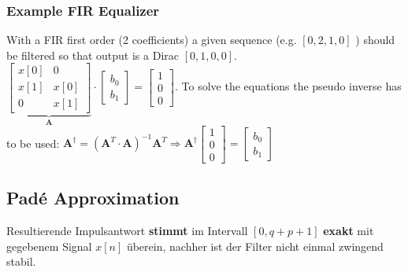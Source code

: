 \subsubsection{Example FIR Equalizer}
With a FIR first order (2 coefficients) a given sequence (e.g. $[0, 2, 1, 0]$ ) should be filtered so that output is a Dirac $[0, 1 , 0 , 0]$.\\
$\underbrace{\begin{bmatrix}
x[0] 	& 0 	\\
x[1]	& x[0]	\\
0		& x[1]
\end{bmatrix}}_{\bm A}
\cdot \begin{bmatrix}
b_0\\
b_1
\end{bmatrix}=\begin{bmatrix}
1\\
0\\
0
\end{bmatrix}$. To solve the equations the pseudo inverse has to be used: $\bm A^{\dagger} = \left(\bm A^T \cdot \bm A\right)^{-1}\bm A^T 
\Rightarrow \bm  A^\dagger \begin{bmatrix}
1\\
0\\
0
\end{bmatrix}=\begin{bmatrix}
b_0\\
b_1
\end{bmatrix}$

\subsection{Padé Approximation }
Resultierende Impulsantwort \textbf{stimmt} im Intervall $[0, q + p + 1]$ \textbf{exakt} mit
gegebenem Signal $x[n]$ überein, nachher ist der Filter nicht einmal zwingend stabil.

